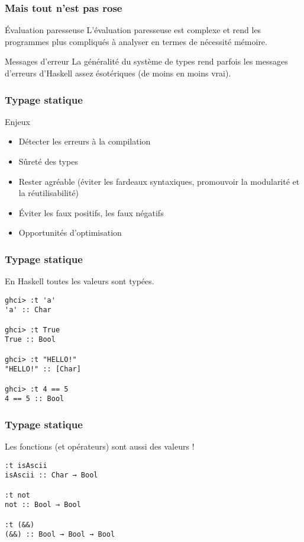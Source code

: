 \documentclass[10pt]{beamer}
\begin{document}
\begin{frame}
\frametitle{Mais tout n'est pas rose}
\begin{block}
{Évaluation paresseuse}
L'évaluation paresseuse est complexe et rend les programmes plus compliqués à
analyser en termes de nécessité mémoire.
\end{block}
\begin{block}
{Messages d'erreur}
La généralité du système de types rend parfois les messages d'erreurs d'Haskell
assez ésotériques (de moins en moins vrai).
\end{block}
\end{frame}



\begin{frame}
\frametitle{Typage statique}
\begin{block}
{Enjeux}
\begin{itemize}
\item Détecter les erreurs à la compilation
\item Sûreté des types
\item Rester agréable (éviter les fardeaux syntaxiques, promouvoir la
modularité et la réutilisabilité)
\item Éviter les faux positifs, les faux négatifs
\item Opportunités d'optimisation
\end{itemize}
\end{block}
\end{frame}



\begin{frame}[fragile]
\frametitle{Typage statique}
En Haskell toutes les valeurs sont typées.
\begin{verbatim}
ghci> :t 'a'
'a' :: Char

ghci> :t True
True :: Bool

ghci> :t "HELLO!"
"HELLO!" :: [Char]

ghci> :t 4 == 5
4 == 5 :: Bool
\end{verbatim}
\end{frame}



\begin{frame}[fragile]
\frametitle{Typage statique}
Les fonctions (et opérateurs) sont aussi des valeurs !
\begin{verbatim}
:t isAscii
isAscii :: Char → Bool

:t not
not :: Bool → Bool

:t (&&)
(&&) :: Bool → Bool → Bool
\end{verbatim}
\end{frame}
\end{document}
